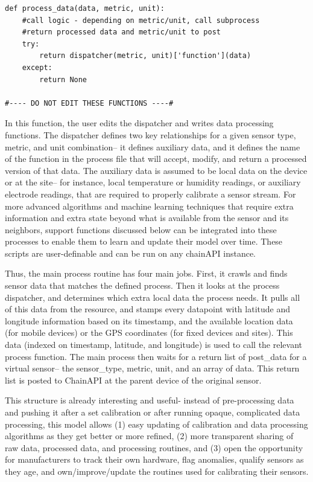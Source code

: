 \begin{lstlisting}[style=code]
def process_data(data, metric, unit):
    #call logic - depending on metric/unit, call subprocess
    #return processed data and metric/unit to post
    try:
        return dispatcher(metric, unit)['function'](data)
    except:
        return None

#---- DO NOT EDIT THESE FUNCTIONS ----#
\end{lstlisting}

In this function, the user edits the dispatcher and writes data processing functions.  The dispatcher defines two key relationships for a given sensor type, metric, and unit combination-- it defines auxiliary data, and it defines the name of the function in the process file that will accept, modify, and return a processed version of that data.  The auxiliary data is assumed to be local data on the device or at the site-- for instance, local temperature or humidity readings, or auxiliary electrode readings, that are required to properly calibrate a sensor stream.  For more advanced algorithms and machine learning techniques that require extra information and extra state beyond what is available from the sensor and its neighbors, support functions discussed below can be integrated into these processes to enable them to learn and update their model over time.  These scripts are user-definable and can be run on any chainAPI instance.

Thus, the main process routine has four main jobs.  First, it crawls and finds sensor data that matches the defined process.  Then it looks at the process dispatcher, and determines which extra local data the process needs.  It pulls all of this data from the resource, and stamps every datapoint with latitude and longitude information based on its timestamp, and the available location data (for mobile devices) or the GPS coordinates (for fixed devices and sites).  This data (indexed on timestamp, latitude, and longitude) is used to call the relevant process function.  The main process then waits for a return list of post\_data for a virtual sensor-- the sensor\_type, metric, unit, and an array of data.  This return list is posted to ChainAPI at the parent device of the original sensor.     

This structure is already interesting and useful- instead of pre-processing data and pushing it after a set calibration or after running opaque, complicated data processing, this model allows (1) easy updating of calibration and data processing algorithms as they get better or more refined, (2) more transparent sharing of raw data, processed data, and processing routines, and (3) open the opportunity for manufacturers to track their own hardware, flag anomalies, qualify sensors as they age, and own/improve/update the routines used for calibrating their sensors.   

